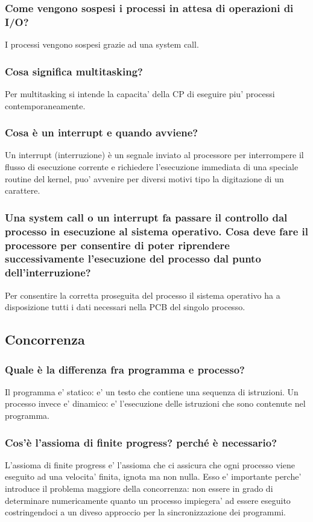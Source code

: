 \documentclass{article}
\begin{document}
\subsubsection{Come vengono sospesi i processi in attesa di operazioni di I/O?}
I processi vengono sospesi grazie ad una system call.
\subsubsection{Cosa significa multitasking?}
Per multitasking si intende la capacita' della CP di eseguire piu' processi
contemporaneamente.
\subsubsection{Cosa è un interrupt e quando avviene?}
Un interrupt (interruzione) è un segnale inviato al processore per interrompere
il flusso di esecuzione corrente e richiedere l'esecuzione immediata di una
speciale routine del kernel, puo' avvenire per diversi motivi tipo la
digitazione di un carattere.
\subsubsection{Una system call o un interrupt fa passare il controllo dal processo in esecuzione al sistema operativo.
    Cosa deve fare il processore per consentire di poter riprendere successivamente l'esecuzione del processo dal punto dell'interruzione?}
Per consentire la corretta proseguita del processo il sistema operativo ha a
disposizione tutti i dati necessari nella PCB del singolo processo.

\subsection{Concorrenza}
\subsubsection{Quale è la differenza fra programma e processo?}
Il programma e' statico: e' un testo che contiene una sequenza di istruzioni.
Un processo invece e' dinamico: e' l'esecuzione delle istruzioni che sono
contenute nel programma.

\subsubsection{Cos'è l'assioma di finite progress? perché è necessario?}
L'assioma di finite progress e' l'assioma che ci assicura che ogni processo
viene eseguito ad una velocita' finita, ignota ma non nulla. Esso e' importante
perche' introduce il problema maggiore della concorrenza: non essere in grado
di determinare numericamente quanto un processo impiegera' ad essere eseguito
costringendoci a un diveso approccio per la sincronizzazione dei programmi.
\end{document}

